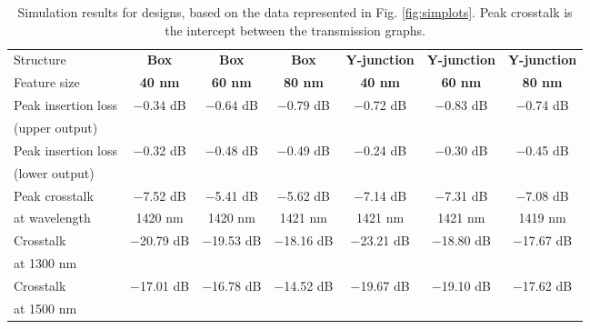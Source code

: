 \begin{table}[h!]
\centering
        \begin{tabular}{|l|c|c|c|c|c|c|}
    \hline
    Structure                    & \textbf{Box} & \textbf{Box} & \textbf{Box} & \textbf{Y-junction} & \textbf{Y-junction} & \textbf{Y-junction} \\ 
    Feature size                    & \textbf{40 nm} & \textbf{60 nm} & \textbf{80 nm} & \textbf{40 nm} & \textbf{60 nm} & \textbf{80 nm} \\ \hline
    Peak insertion loss  & $-0.34$ dB  & $-0.64$ dB  & $-0.79$ dB  & $-$0.72 dB         & $-$0.83 dB         & $-$0.74 dB         \\
    (upper output)       & ~         & ~         & ~         & ~                & ~                & ~                \\ \hline
    Peak insertion loss  & $-$0.32 dB  & $-$0.48 dB  & $-$0.49 dB  & $-$0.24 dB         & $-$0.30 dB         & $-$0.45 dB         \\
    (lower output)       & ~         & ~         & ~         & ~                & ~                & ~                \\ \hline
    Peak crosstalk & $-$7.52 dB  & $-$5.41 dB  & $-$5.62 dB  & $-$7.14 dB         & $-$7.31 dB         & $-$7.08 dB         \\
    at wavelength         & 1420 nm   & 1420 nm   & 1421 nm   & 1421 nm          & 1421 nm            & 1419 nm            \\ \hline
    Crosstalk  & $-$20.79 dB & $-$19.53 dB & $-$18.16 dB & $-$23.21 dB        & $-$18.80 dB        & $-$17.67 dB        \\
    at 1300 nm       & ~         & ~         & ~         & ~                & ~                & ~                \\
    \hline
    Crosstalk  & $-$17.01 dB & $-$16.78 dB & $-$14.52 dB & $-$19.67 dB        & $-$19.10 dB        & $-$17.62 dB        \\
    at 1500 nm       & ~         & ~         & ~         & ~                & ~                & ~                \\ 
    \hline
    \end{tabular}
    \caption{Simulation results for designs, based on the data represented in Fig. \ref{fig:simplots}. Peak crosstalk is the intercept between the transmission graphs.}
    \label{simtable}
\end{table}